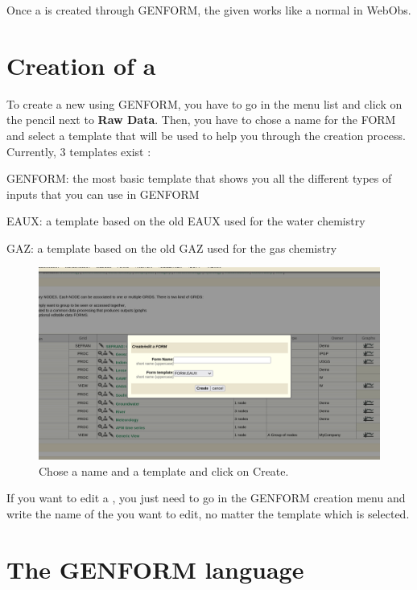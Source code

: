 Once a  is created through GENFORM, the given  works like a normal  in WebObs.

\section{Creation of a }

To create a new  using GENFORM, you have to go in the  menu list and click on the pencil next to \textbf{Raw Data}. Then, you have to chose a name for the FORM and select a template that will be used to help you through the creation process. Currently, 3 templates exist : 

\begin{list}
	\item GENFORM: the most basic template that shows you all the different types of inputs that you can use in GENFORM
	\item EAUX: a template based on the old EAUX  used for the water chemistry
	\item GAZ: a template based on the old GAZ  used for the gas chemistry
\end{list}

\begin{figure}[!h]
	\centering
	\includegraphics[width=\textwidth]{figures/GENFORM_creation.png}
	\caption{Chose a name and a template and click on Create.}
\end{figure}

If you want to edit a , you just need to go in the GENFORM creation menu and write the name of the  you want to edit, no matter the template which is selected.

\section{The GENFORM language}


